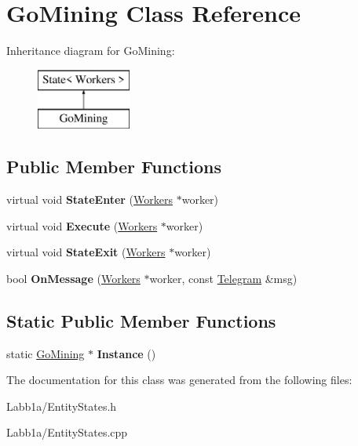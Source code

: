 \hypertarget{class_go_mining}{}\section{Go\+Mining Class Reference}
\label{class_go_mining}
Inheritance diagram for Go\+Mining\+:\begin{figure}[H]
\begin{center}
\leavevmode
\includegraphics[height=2.000000cm]{class_go_mining}
\end{center}
\end{figure}
\subsection*{Public Member Functions}
\begin{DoxyCompactItemize}
\item 
\hypertarget{class_go_mining_af0b79e9f94e9c8831940b370028ed628}{}virtual void {\bfseries State\+Enter} (\hyperlink{class_workers}{Workers} $\ast$worker)\label{class_go_mining_af0b79e9f94e9c8831940b370028ed628}

\item 
\hypertarget{class_go_mining_a0b6bc0558351394e8f21cdada67e5798}{}virtual void {\bfseries Execute} (\hyperlink{class_workers}{Workers} $\ast$worker)\label{class_go_mining_a0b6bc0558351394e8f21cdada67e5798}

\item 
\hypertarget{class_go_mining_a14a2a824d0b1a2f0f6dcf7cc50caf76d}{}virtual void {\bfseries State\+Exit} (\hyperlink{class_workers}{Workers} $\ast$worker)\label{class_go_mining_a14a2a824d0b1a2f0f6dcf7cc50caf76d}

\item 
\hypertarget{class_go_mining_a1c6d47e453dfc5c75a789a77026a1488}{}bool {\bfseries On\+Message} (\hyperlink{class_workers}{Workers} $\ast$worker, const \hyperlink{struct_telegram}{Telegram} \&msg)\label{class_go_mining_a1c6d47e453dfc5c75a789a77026a1488}

\end{DoxyCompactItemize}
\subsection*{Static Public Member Functions}
\begin{DoxyCompactItemize}
\item 
\hypertarget{class_go_mining_a01ae560d43f2a7970cfa0299051e8870}{}static \hyperlink{class_go_mining}{Go\+Mining} $\ast$ {\bfseries Instance} ()\label{class_go_mining_a01ae560d43f2a7970cfa0299051e8870}

\end{DoxyCompactItemize}


The documentation for this class was generated from the following files\+:\begin{DoxyCompactItemize}
\item 
Labb1a/Entity\+States.\+h\item 
Labb1a/Entity\+States.\+cpp\end{DoxyCompactItemize}
